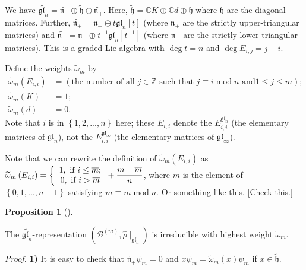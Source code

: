 \documentclass
[numbers=enddot,12pt,final,onecolumn,german,notitlepage]{scrartcl}%
\theoremstyle{definition}
\newtheorem{prop}[theo]{Proposition}
\newenvironment{proposition}[1][]
{\begin{prop}[#1]\begin{leftbar}}
{\end{leftbar}\end{prop}}
\begin{document}
We have $\widetilde{\mathfrak{gl}_{n}}=\widetilde{\mathfrak{n}_{-}}%
\oplus\widetilde{\mathfrak{h}}\oplus\widetilde{\mathfrak{n}_{+}}$. Here,
$\widetilde{\mathfrak{h}}=\mathbb{C}K\oplus\mathbb{C}d\oplus\mathfrak{h}$
where $\mathfrak{h}$ are the diagonal matrices. Further,
$\widetilde{\mathfrak{n}_{+}}=\mathfrak{n}_{+}\oplus t\mathfrak{gl}_{n}\left[
t\right]  $ (where $\mathfrak{n}_{+}$ are the strictly upper-triangular
matrices) and $\widetilde{\mathfrak{n}_{-}}=\mathfrak{n}_{-}\oplus
t^{-1}\mathfrak{gl}_{n}\left[  t^{-1}\right]  $ (where $\mathfrak{n}_{-}$ are
the strictly lower-triangular matrices). This is a graded Lie algebra with
$\deg t=n$ and $\deg E_{i,j}=j-i$.

Define the weights $\widetilde{\omega}_{m}$ by%
\begin{align*}
\widetilde{\omega}_{m}\left(  E_{i,i}\right)   &  =\left(  \text{the number of
all }j\in\mathbb{Z}\text{ such that }j\equiv i\operatorname{mod}n\text{ and
}1\leq j\leq m\right)  ;\\
\widetilde{\omega}_{m}\left(  K\right)   &  =1;\\
\widetilde{\omega}_{m}\left(  d\right)   &  =0.
\end{align*}
Note that $i$ is in $\left\{  1,2,...,n\right\}  $ here; these $E_{i,i}$
denote the $E_{i,i}^{\mathfrak{gl}_{n}}$ (the elementary matrices of
$\mathfrak{gl}_{n}$), not the $E_{i,i}^{\mathfrak{gl}_{\infty}}$ (the
elementary matrices of $\mathfrak{gl}_{\infty}$).

Note that we can rewrite the definition of $\widetilde{\omega}_{m}\left(
E_{i,i}\right)  $ as $\widetilde{\omega}_{m}\left(  E_{i,i}\right)  =\left\{
\begin{array}
[c]{c}%
1,\text{ if }i\leq\overline{m};\\
0,\text{ if }i>\overline{m}%
\end{array}
\right.  +\dfrac{m-\overline{m}}{n}$, where $\overline{m}$ is the element of
$\left\{  0,1,...,n-1\right\}  $ satisfying $m\equiv\overline{m}%
\operatorname{mod}n$. Or something like this. [Check this.]

\begin{proposition}
The $\widetilde{\mathfrak{gl}_{n}}$-representation $\left(  \mathcal{B}%
^{\left(  m\right)  },\widehat{\rho}\mid_{\widetilde{\mathfrak{gl}_{n}}%
}\right)  $ is irreducible with highest weight $\widetilde{\omega}_{m}$.
\end{proposition}

\textit{Proof.} \textbf{1)} It is easy to check that $\widetilde{\mathfrak{n}%
_{+}}\psi_{m}=0$ and $x\psi_{m}=\widetilde{\omega}_{m}\left(  x\right)
\psi_{m}$ if $x\in\widetilde{\mathfrak{h}}$.
\end{document}
